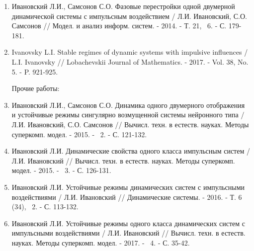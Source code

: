 \documentclass[12pt]{extarticle}
\begin{document}
\begin{enumerate}[label=\arabic*),leftmargin=1.5\parindent]

\item Ивановский Л.И., Самсонов С.О. Фазовые перестройки одной двумерной динамической системы с импульсным воздействием / Л.И. Ивановский, С.О. Самсонов // Модел. и анализ информ. систем. - 2014. - Т. 21, \textnumero~6. - С. 179-181.
\item Ivanovsky L.I. Stable regimes of dynamic systems with impulsive influences / L.I. Ivanovsky // 
Lobachevskii Journal of Mathematics. - 2017. - Vol. 38, No. 5. - P. 921-925.

\hspace{-1.25cm} Прочие работы:

\item Ивановский Л.И., Самсонов С.О. Динамика одного двумерного отображения и устойчивые режимы сингулярно возмущенной системы нейронного типа / Л.И. Ивановский, С.О. Самсонов // Вычисл. техн. в естеств. науках. Методы суперкомп. модел. - 2015. - \textnumero~2. - С. 121-132.
\item Ивановский Л.И. Динамические свойства одного класса импульсным систем / Л.И. Ивановский // Вычисл. техн. в естеств. науках. Методы суперкомп. модел. - 2015. - \textnumero~3. - С. 126-131.
\item Ивановский Л.И. Устойчивые режимы динамических систем с импульсными воздействиями / Л.И. Ивановский  // Динамические системы. - 2016. - Т. 6 (34), \textnumero~2. - С. 113-132.
\item Ивановский Л.И. Устойчивые режимы одного класса динамических систем с импульсными воздействиями / Л.И. Ивановский  // Вычисл. техн. в естеств. науках. Методы суперкомп. модел. - 2017. - \textnumero~4. - С. 35-42.

\end{enumerate}
\end{document}
